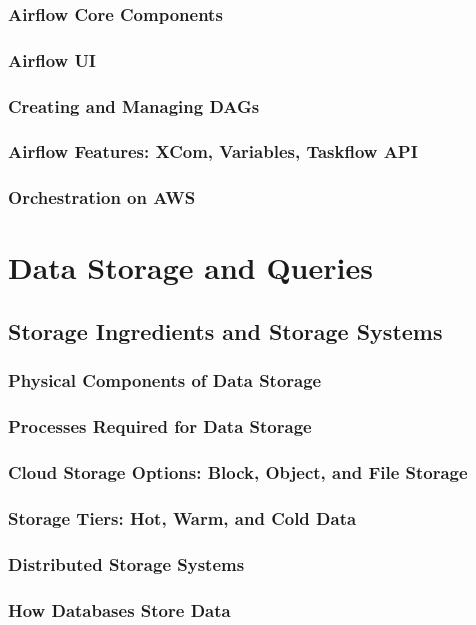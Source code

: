 \subsubsection{Airflow Core Components}
\subsubsection{Airflow UI}
\subsubsection{Creating and Managing DAGs}
\subsubsection{Airflow Features: XCom, Variables, Taskflow API}
\subsubsection{Orchestration on AWS}

\section{Data Storage and Queries}
\subsection{Storage Ingredients and Storage Systems}
\subsubsection{Physical Components of Data Storage}
\subsubsection{Processes Required for Data Storage}
\subsubsection{Cloud Storage Options: Block, Object, and File Storage}
\subsubsection{Storage Tiers: Hot, Warm, and Cold Data}
\subsubsection{Distributed Storage Systems}
\subsubsection{How Databases Store Data}
